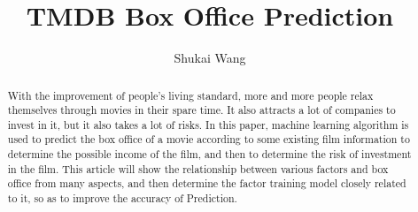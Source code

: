 \documentclass{amsart}
\begin{document}
%
%
\title[TMDB Box Office Prediction]{TMDB Box Office Prediction}%

\author{Shukai Wang}
\address[A.~1]{School of Computer Science,\\ 
Xi'an Shiyou University, Shaanxi 710065, China}%




%
%
\date{\gitAuthorDate}%

\begin{abstract}
With the improvement of people's living standard,
 more and more people relax themselves through movies in their spare time. 
 It also attracts a lot of companies to invest in it, but it also takes a lot of risks. 
 In this paper, machine learning algorithm is used to predict 
 the box office of a movie according to some existing film information to determine 
 the possible income of the film, and then to determine the risk of investment in the film. 
 This article will show the relationship between various factors and box office from many aspects,
  and then determine the factor training model closely related to it, so as to improve the accuracy of Prediction.
\end{abstract}

\maketitle
\tableofcontents

\newpage



\newpage



\end{document}
